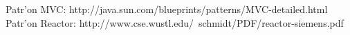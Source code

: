 \begin{thebibliography}{99}
 Patr'on MVC: http://java.sun.com/blueprints/patterns/MVC-detailed.html
 Patr'on Reactor: http://www.cse.wustl.edu/~schmidt/PDF/reactor-siemens.pdf
\end{thebibliography}


